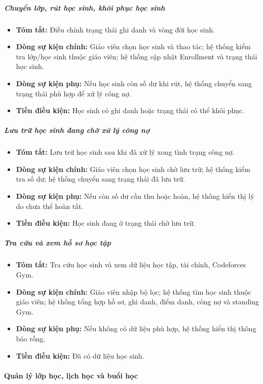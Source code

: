 \documentclass[12pt,a4paper]{article}
\begin{document}
\subparagraph{Chuyển lớp, rút học sinh, khôi phục học sinh}
\begin{itemize}[leftmargin=*]
\item \textbf{Tóm tắt:} Điều chỉnh trạng thái ghi danh và vòng đời học sinh.
\item \textbf{Dòng sự kiện chính:} Giáo viên chọn học sinh và thao tác; hệ thống kiểm tra lớp/học sinh thuộc giáo viên; hệ thống cập nhật Enrollment và trạng thái học sinh.
\item \textbf{Dòng sự kiện phụ:} Nếu học sinh còn số dư khi rút, hệ thống chuyển sang trạng thái phù hợp để xử lý công nợ.
\item \textbf{Tiền điều kiện:} Học sinh có ghi danh hoặc trạng thái có thể khôi phục.
\end{itemize}

\subparagraph{Lưu trữ học sinh đang chờ xử lý công nợ}
\begin{itemize}[leftmargin=*]
\item \textbf{Tóm tắt:} Lưu trữ học sinh sau khi đã xử lý xong tình trạng công nợ.
\item \textbf{Dòng sự kiện chính:} Giáo viên chọn học sinh chờ lưu trữ; hệ thống kiểm tra số dư; hệ thống chuyển sang trạng thái đã lưu trữ.
\item \textbf{Dòng sự kiện phụ:} Nếu còn số dư cần thu hoặc hoàn, hệ thống hiển thị lý do chưa thể hoàn tất.
\item \textbf{Tiền điều kiện:} Học sinh đang ở trạng thái chờ lưu trữ.
\end{itemize}

\subparagraph{Tra cứu và xem hồ sơ học tập}
\begin{itemize}[leftmargin=*]
\item \textbf{Tóm tắt:} Tra cứu học sinh và xem dữ liệu học tập, tài chính, Codeforces Gym.
\item \textbf{Dòng sự kiện chính:} Giáo viên nhập bộ lọc; hệ thống tìm học sinh thuộc giáo viên; hệ thống tổng hợp hồ sơ, ghi danh, điểm danh, công nợ và standing Gym.
\item \textbf{Dòng sự kiện phụ:} Nếu không có dữ liệu phù hợp, hệ thống hiển thị thông báo rỗng.
\item \textbf{Tiền điều kiện:} Đã có dữ liệu học sinh.
\end{itemize}

\paragraph{Quản lý lớp học, lịch học và buổi học}
\end{document}

